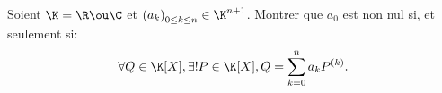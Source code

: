 \begin{enonce}
\begin{exercise}[ID={RMS125 E639, 2014 Mines-Ponts PSI},subtitle={2014 Mines-Ponts PSI},tags={}, difficulty={0}]
Soient $\K=\R\ou\C$ et $\left( a_k \right)_{0\leq k\leq n}\in\K^{n+1}$.
Montrer que $a_0$ est non nul si, et seulement si:
\begin{equation*}
\forall Q\in\K[X], \exists!P\in\K[X], Q=\sum_{k=0}^n a_k P^{(k)}.
\end{equation*}
\end{exercise}
\begin{solution}
\end{solution}
\end{enonce}
